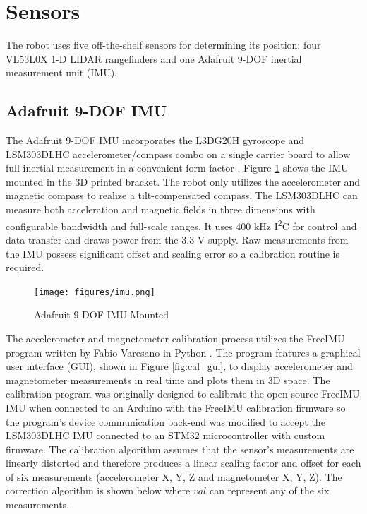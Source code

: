 \section{Sensors}
The robot uses five off-the-shelf sensors for determining its position: four VL53L0X 1-D LIDAR rangefinders and one Adafruit 9-DOF inertial measurement unit (IMU).

\subsection{Adafruit 9-DOF IMU}
The Adafruit 9-DOF IMU incorporates the L3DG20H gyroscope and LSM303DLHC accelerometer/compass combo on a single carrier board to allow full inertial measurement in a convenient form factor \cite{adafruit_imu}. Figure \ref{fig:imu} shows the IMU mounted in the 3D printed bracket. The robot only utilizes the accelerometer and magnetic compass to realize a tilt-compensated compass. The LSM303DLHC can measure both acceleration and magnetic fields in three dimensions with configurable bandwidth and full-scale ranges. It uses 400 kHz I\textsuperscript{2}C for control and data transfer and draws power from the 3.3 V supply. Raw measurements from the IMU possess significant offset and scaling error so a calibration routine is required.

\begin{figure}[H]   %
	\centering \texttt{[image: figures/imu.png]}
	\caption{Adafruit 9-DOF IMU Mounted}\label{fig:imu}
\end{figure}

The accelerometer and magnetometer calibration process utilizes the FreeIMU program written by Fabio Varesano in Python \cite{freeimu}. The program features a graphical user interface (GUI), shown in Figure \ref{fig:cal_gui},  to display accelerometer and magnetometer measurements in real time and plots them in 3D space. The calibration program was originally designed to calibrate the open-source FreeIMU IMU when connected to an Arduino with the FreeIMU calibration firmware so the program's device communication back-end was modified to accept the LSM303DLHC IMU connected to an STM32 microcontroller with custom firmware. The calibration algorithm assumes that the sensor's measurements are linearly distorted and therefore produces a linear scaling factor and offset for each of six measurements (accelerometer X, Y, Z and magnetometer X, Y, Z). The correction algorithm is shown below where $val$ can represent any of the six measurements.

